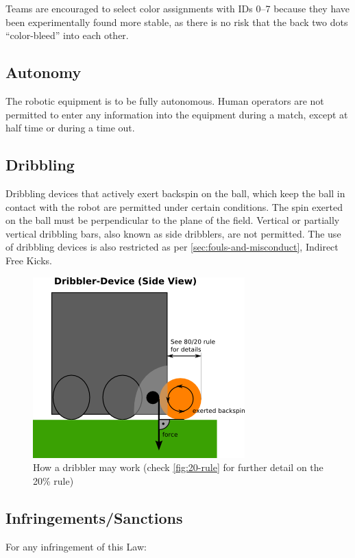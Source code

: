 Teams are encouraged to select color assignments with IDs 0--7 because they have been experimentally found more stable, as there is no risk that the back two dots ``color-bleed'' into each other.

\subsection{Autonomy}
The robotic equipment is to be fully autonomous.
Human operators are not permitted to enter any information into the equipment during a match, except at half time or during a time out.

\subsection{Dribbling}
Dribbling devices that actively exert backspin on the ball, which keep the ball in contact with the robot are permitted under certain conditions.
The spin exerted on the ball must be perpendicular to the plane of the field.
Vertical or partially vertical dribbling bars, also known as side dribblers, are not permitted.
The use of dribbling devices is also restricted as per \autoref{sec:fouls-and-misconduct}, Indirect Free Kicks.

\begin{figure}[ht]
	\centering
	\includegraphics[width=0.5\columnwidth]{img/dribblers_1.png}
	\caption{How a dribbler may work (check \autoref{fig:20-rule} for further detail on the 20\% rule)}
	\label{fig:dribblers}
\end{figure}

\subsection{Infringements/Sanctions}
For any infringement of this Law:

